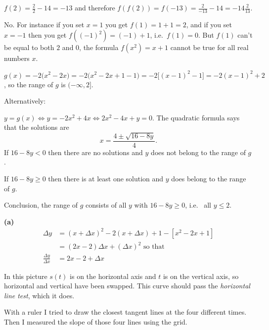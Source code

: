 $f(2) = \frac{2}{2}-14 = -13 $ and therefore $f(f(2)) = f(-13) = \frac{2}{-13}-14 = -14\frac2{13} $.
\bigskip

\item[{\bfseries(I7.16)}]

No.  For instance if you set $x=1$ you get $f(1) = 1+1=2$, and if you set
$x=-1$ then you get $f((-1)^2) = (-1)+1$, i.e.\ $f(1) = 0$.  But $f(1)$
can't be equal to both $2$ and $0$, the formula $f(x^2) = x+1$ cannot be
true for all real numbers $x$.
\bigskip

\item[{\bfseries(I7.18)}]

$g(x) = -2\bigl(x^2-2x\bigr)
= -2\bigl(x^2-2x+1 -1\bigr)
= -2\bigl[(x-1)^2 -1\bigr]
=-2(x-1)^2 + 2$, so the range of $g$ is $(-\infty, 2]$.

Alternatively:


$y = g(x) \iff y = -2x^2+4x \iff 2x^2-4x+y = 0$.
The quadratic formula says that the solutions are
\[
  x= \frac{4\pm\sqrt{16-8y}} {4}.
\]
If $16-8y<0$ then there are no solutions and $y$ does
not belong to the range of $g$.

If $16-8y\geq0$ then there is at least one solution
and  $y$ does belong to the range of $g$.


Conclusion, the range of $g$ consists of all $y$ with
$16-8y\geq 0$, i.e.~ all $y\leq2$.
\bigskip

\item[{\bfseries(II6.3)}]

\textbf{(a)}
\begin{align*}
  \Delta y &= (x+\Delta x)^2  -2 (x+\Delta x)+1 - [x^2-2x+1]\\
  &=(2x-2)\Delta x +(\Delta x)^2 \text{ so that}\\
  \frac{\Delta y}{\Delta x}&= 2x-2 + \Delta x
\end{align*}
\bigskip

\item[{\bfseries(II6.4a)}]

In this picture $s(t)$ is on the horizontal axis and $t$ is on the vertical axis, so
horizontal and vertical have been swapped. This curve should pass the \emph{horizontal
line test}, which it does.
\bigskip

\item[{\bfseries(II6.4b)}]

With a ruler I tried to draw the closest tangent lines at
the four different times.  Then I measured the slope of those
four lines using the grid.
\bigskip

